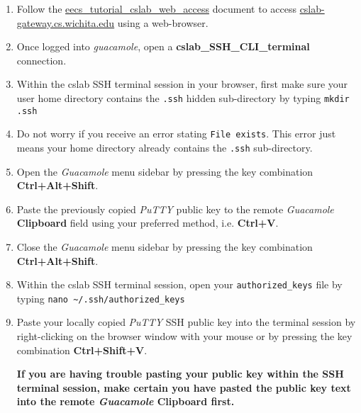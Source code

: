 \documentclass[12pt]{article}
\begin{document}
\begin{flushleft}
\begin{enumerate}
  \item Follow the \href{https://github.com/benroose/tutorials/blob/master/cslab_tutorials/eecs_tutorial_cslab_web_access.pdf}{eecs\_tutorial\_cslab\_web\_access} document to access \href{https://cslab-gateway.cs.wichita.edu/}{cslab-gateway.cs.wichita.edu} using a web-browser.
  \item Once logged into \textit{guacamole}, open a \textbf{cslab\_SSH\_CLI\_terminal} connection.
  \item Within the cslab SSH terminal session in your browser, first make sure your user home directory contains the \verb|.ssh| hidden sub-directory by typing
    \verb|mkdir .ssh|
  \item Do not worry if you receive an error stating \verb|File exists|. This error just means your home directory already contains the \verb|.ssh| sub-directory.
  \item Open the \textit{Guacamole} menu sidebar by pressing the key combination \textbf{Ctrl+Alt+Shift}.
  \item Paste the previously copied \textit{PuTTY} public key to the remote \textit{Guacamole} \textbf{Clipboard} field using your preferred method, i.e. \textbf{Ctrl+V}.
  \item Close the \textit{Guacamole} menu sidebar by pressing the key combination \textbf{Ctrl+Alt+Shift}.
  \item Within the cslab SSH terminal session, open your \verb|authorized_keys| file by typing \break
    \verb|nano ~/.ssh/authorized_keys|
  \item Paste your locally copied \textit{PuTTY} SSH public key into the terminal session by right-clicking on the browser window with your mouse or by pressing the key combination \textbf{Ctrl+Shift+V}.
    
      {\bf If you are having trouble pasting your public key within the SSH terminal session, make certain you have pasted the public key text into the remote \textit{Guacamole} \textbf{Clipboard} first.}


\end{enumerate}
\end{flushleft}
\end{document}
